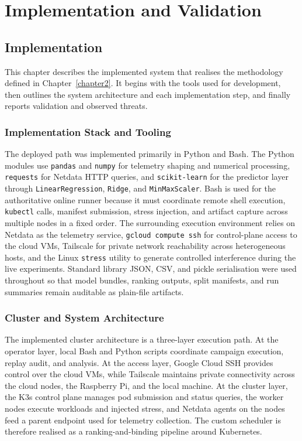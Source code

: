 \chapter{Implementation and Validation}
\label{chapter3}

\section{Implementation}

This chapter describes the implemented system that realises the methodology defined in Chapter~\ref{chapter2}. It begins with the tools used for development, then outlines the system architecture and each implementation step, and finally reports validation and observed threats.

\subsection{Implementation Stack and Tooling}

The deployed path was implemented primarily in Python and Bash. The Python modules use \texttt{pandas} and \texttt{numpy} for telemetry shaping and numerical processing, \texttt{requests} for Netdata HTTP queries, and \texttt{scikit-learn} for the predictor layer through \texttt{LinearRegression}, \texttt{Ridge}, and \texttt{MinMaxScaler}. Bash is used for the authoritative online runner because it must coordinate remote shell execution, \texttt{kubectl} calls, manifest submission, stress injection, and artifact capture across multiple nodes in a fixed order. The surrounding execution environment relies on Netdata as the telemetry service, \texttt{gcloud compute ssh} for control-plane access to the cloud VMs, Tailscale for private network reachability across heterogeneous hosts, and the Linux \texttt{stress} utility to generate controlled interference during the live experiments. Standard library JSON, CSV, and pickle serialisation were used throughout so that model bundles, ranking outputs, split manifests, and run summaries remain auditable as plain-file artifacts.

\subsection{Cluster and System Architecture}

The implemented cluster architecture is a three-layer execution path. At the operator layer, local Bash and Python scripts coordinate campaign execution, replay audit, and analysis. At the access layer, Google Cloud SSH provides control over the cloud VMs, while Tailscale maintains private connectivity across the cloud nodes, the Raspberry Pi, and the local machine. At the cluster layer, the K3s control plane manages pod submission and status queries, the worker nodes execute workloads and injected stress, and Netdata agents on the nodes feed a parent endpoint used for telemetry collection. The custom scheduler is therefore realised as a ranking-and-binding pipeline around Kubernetes.

